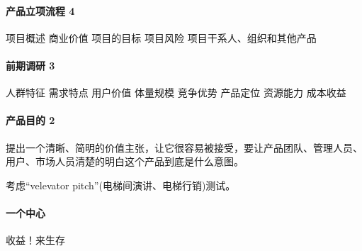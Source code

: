 \documentclass[letterpaper,10pt,english]{sphinxmanual}
\begin{document}
\paragraph{产品立项流程 4\sphinxfootnotemark[484]}
\label{\detokenize{chapter_knowledge/BRD:id3}}%
\begin{footnotetext}[484]\sphinxAtStartFootnote
{}
%
\end{footnotetext}\ignorespaces 
项目概述 商业价值 项目的目标 项目风险 项目干系人、组织和其他产品


\paragraph{前期调研 3\sphinxfootnotemark[485]}
\label{\detokenize{chapter_knowledge/BRD:id4}}%
\begin{footnotetext}[485]\sphinxAtStartFootnote
{}
%
\end{footnotetext}\ignorespaces 
人群特征 需求特点 用户价值 体量规模 竞争优势 产品定位 资源能力 成本收益


\paragraph{产品目的 2\sphinxfootnotemark[486]}
\label{\detokenize{chapter_knowledge/BRD:id5}}%
\begin{footnotetext}[486]\sphinxAtStartFootnote
{}
%
\end{footnotetext}\ignorespaces 
提出一个清晰、简明的价值主张，让它很容易被接受，要让产品团队、管理人员、用户、市场人员清楚的明白这个产品到底是什么意图。

考虑“velevator pitch”(电梯间演讲、电梯行销)测试。


\paragraph{一个中心}
\label{\detokenize{chapter_knowledge/BRD:id6}}
收益！来生存
\end{document}
